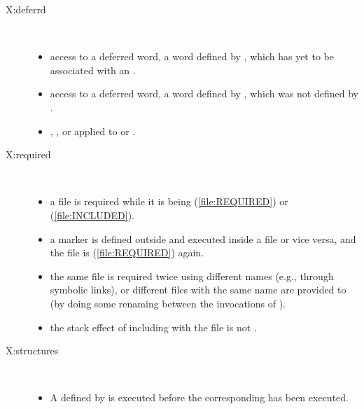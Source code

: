 \begin{description}


\item[\textsf{X:deferrd}] ~
	\begin{itemize}
\item access to a deferred word, a word defined by ,
	which has yet to be associated with an .

\item access to a deferred word, a word defined by ,
	which was not defined by .

\item {}, ,
	 or  applied to 
	or .
	\end{itemize}


\item[\textsf{X:required}] ~
	\begin{itemize}
\item a file is required while it is being 
	(\ref{file:REQUIRED}) or  (\ref{file:INCLUDED}).

\item a marker is defined outside and executed inside a file or vice
	versa, and the file is  (\ref{file:REQUIRED})
	again.

\item the same file is required twice using different names (e.g.,
	through symbolic links), or different files with the same name are
	provided to  (by doing some renaming
	between the invocations of ).

\item the stack effect of including with 
	the file is not .
	\end{itemize}


\item[\textsf{X:structures}] ~
	\begin{itemize}
\item A  defined by
	is executed before the corresponding
	has been executed.
	\end{itemize}
\end{description}


